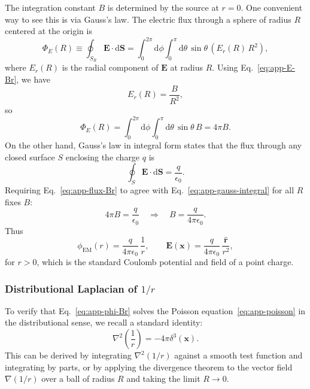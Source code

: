 \documentclass[11pt]{article}
\newcommand{\dd}{\mathrm{d}}
\begin{document}
The integration constant $B$ is determined by the source at $r=0$.  One convenient way to see this is via Gauss's law.  The electric flux through a sphere of radius $R$ centered at the origin is
\begin{equation}
\Phi_E(R)
\equiv \oint_{S_R} \mathbf{E}\cdot\dd\mathbf{S}
= \int_0^{2\pi}\!\!\dd\phi \int_0^\pi \!\dd\theta\,\sin\theta\,\left(E_r(R)\,R^2\right),
\end{equation}
where $E_r(R)$ is the radial component of $\mathbf{E}$ at radius $R$.  Using Eq.~\eqref{eq:app-E-Br}, we have
\begin{equation}
E_r(R) = \frac{B}{R^2},
\end{equation}
so
\begin{equation}
\Phi_E(R)
= \int_0^{2\pi}\!\!\dd\phi \int_0^\pi \!\dd\theta\,\sin\theta\,B
= 4\pi B.
\label{eq:app-flux-Br}
\end{equation}
On the other hand, Gauss's law in integral form states that the flux through any closed surface $S$ enclosing the charge $q$ is
\begin{equation}
\oint_{S} \mathbf{E}\cdot\dd\mathbf{S}
= \frac{q}{\epsilon_0}.
\label{eq:app-gauss-integral}
\end{equation}
Requiring Eq.~\eqref{eq:app-flux-Br} to agree with Eq.~\eqref{eq:app-gauss-integral} for all $R$ fixes $B$:
\begin{equation}
4\pi B = \frac{q}{\epsilon_0}
\quad\Longrightarrow\quad
B = \frac{q}{4\pi\epsilon_0}.
\end{equation}
Thus
\begin{equation}
\phi_{\mathrm{EM}}(r)
= \frac{q}{4\pi\epsilon_0}\,\frac{1}{r},
\qquad
\mathbf{E}(\mathbf{x})
= \frac{q}{4\pi\epsilon_0}\,\frac{\hat{\mathbf{r}}}{r^2},
\end{equation}
for $r>0$, which is the standard Coulomb potential and field of a point charge.

\subsubsection{Distributional Laplacian of \texorpdfstring{$1/r$}{1/r}}

To verify that Eq.~\eqref{eq:app-phi-Br} solves the Poisson equation~\eqref{eq:app-poisson} in the distributional sense, we recall a standard identity:
\begin{equation}
\nabla^2 \left(\frac{1}{r}\right) = -4\pi \delta^3(\mathbf{x}).
\label{eq:app-laplacian-1overr}
\end{equation}
This can be derived by integrating $\nabla^2(1/r)$ against a smooth test function and integrating by parts, or by applying the divergence theorem to the vector field $\nabla(1/r)$ over a ball of radius $R$ and taking the limit $R\to 0$.
\end{document}
